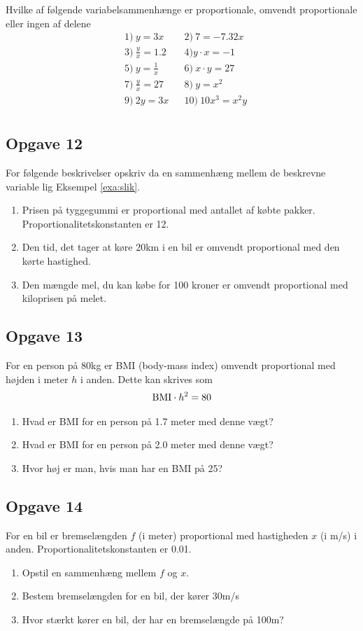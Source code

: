 Hvilke af følgende variabelsammenhænge er proportionale, omvendt proportionale eller ingen af delene
\begin{align*}
	&1) \ y = 3x   &&2) \  7 = -7.32x \\
	&3) \ \frac{y}{x} = 1.2  &&4) y\cdot x = -1 \\
	&5) \  y = \frac{1}{x} &&6) \  x\cdot y = 27    \\
	&7) \ \frac{y}{x} = 27 &&8) \  y=x^2   \\
	&9) \ 2y = 3x &&10) \ 10x^3 = x^2y    \\
\end{align*}

\subsection*{Opgave 12}
For følgende beskrivelser opskriv da en sammenhæng mellem de beskrevne variable lig Eksempel \ref{exa:slik}.
\begin{enumerate}[label=\roman*)]
	\item Prisen på tyggegummi er proportional med antallet af købte pakker. Proportionalitetskonstanten er 12.
	\item Den tid, det tager at køre 20km i en bil er omvendt proportional med den kørte hastighed.
	\item Den mængde mel, du kan købe for 100 kroner er omvendt proportional med kiloprisen på melet. 
\end{enumerate}

\subsection*{Opgave 13}
For en person på 80kg er BMI (body-mass index) omvendt proportional med højden i meter $h$ i anden. Dette kan skrives som
\begin{align*}
	\textnormal{BMI} \cdot h^2 = 80
\end{align*}
\begin{enumerate}[label=\roman*)]
	\item Hvad er BMI for en person på 1.7 meter med denne vægt?
	\item Hvad er BMI for en person på 2.0 meter med denne vægt?
	\item Hvor høj er man, hvis man har en BMI på 25?
\end{enumerate}

\subsection*{Opgave 14}
For en bil er bremselængden $f$ (i meter) proportional med hastigheden $x$ (i m/s) i anden. Proportionalitetskonstanten er 0.01.

\begin{enumerate}[label=\roman*)]
	\item Opstil en sammenhæng mellem $f$ og $x$.
	\item Bestem bremselængden for en bil, der kører 30m/s
	\item Hvor stærkt kører en bil, der har en bremselængde på 100m?
\end{enumerate}


